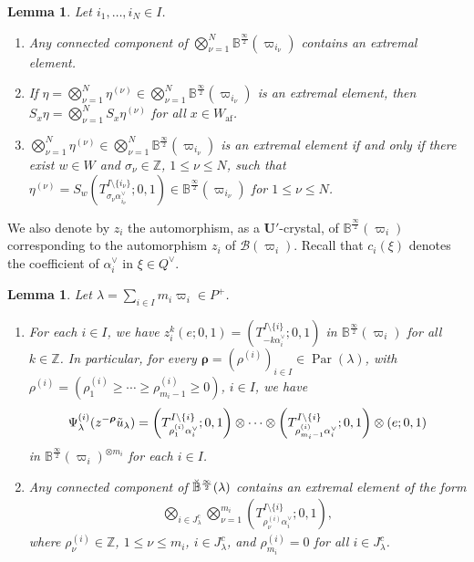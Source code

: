\documentclass[10pt]{amsart}
\newtheorem{lemm}[theo]{Lemma}
\theoremstyle{definition}\newtheorem{defi}[theo]{Definition}
\theoremstyle{remark}\newtheorem{rema}[theo]{Remark}
\newcommand{\BZ}{\mathbb{Z}}
\newcommand\bmrho[1]{\boldsymbol{#1}}
\newcommand{\U}{\mathbf{U}}
\newcommand{\si}{\frac{\infty}{2}}
\DeclareMathOperator{\af}{af}
\DeclareMathOperator{\Par}{Par}
\begin{document}
\begin{lemm} \label{lem:extremal-paths}
Let 
$i_1 , \ldots , i_N \in I$. 
\begin{enumerate}[label=(\arabic*)]
\item\label{Lemm3.7_1}
Any connected component of 
$\bigotimes_{\nu = 1}^N \mathbb{B}^{\si}(\varpi_{i_{\nu}})$ 
contains an extremal element.
\item\label{Lemm3.7_2}
If 
$\eta = \bigotimes_{\nu = 1}^N \eta^{(\nu)} \in \bigotimes_{\nu = 1}^N \mathbb{B}^{\si}(\varpi_{i_{\nu}})$
is an extremal element, then 
$S_x \eta = \bigotimes_{\nu = 1}^N S_x \eta^{(\nu)}$
for all 
$x \in W_{\af}$. 
\item\label{Lemm3.7_3}
$\bigotimes_{\nu = 1}^N \eta^{(\nu)} \in \bigotimes_{\nu = 1}^N \mathbb{B}^{\si}(\varpi_{i_{\nu}})$
is an extremal element if and only if there exist
$w \in W$ 
and 
$\sigma_{\nu} \in \BZ$, $1 \leq \nu \leq N$, 
such that 
$\eta^{(\nu)} 
= 
S_w \left( T^{I \setminus \{ i_{\nu} \}}_{\sigma_{\nu} \alpha_{i_{\nu}}^{\vee}} ; 0,1 \right) \in \mathbb{B}^{\si}(\varpi_{i_{\nu}})$
for 
$1 \leq \nu \leq N$. 
\end{enumerate}
\end{lemm}

We also denote by
$z_i$ 
the automorphism, as a $\U'$-crystal, of 
$\mathbb{B}^{\si}(\varpi_i)$ 
corresponding to the automorphism 
$z_i$ 
of 
$\mathcal{B}(\varpi_i)$.
Recall that 
$c_i(\xi)$ 
denotes the coefficient of 
$\alpha_i^{\vee}$ 
in 
$\xi \in Q^{\vee}$.

\begin{lemm} \label{lem:SiLS_W-action}
Let 
$\lambda = \sum_{i \in I} m_i \varpi_i \in P^+$. 
\begin{enumerate}[label=(\arabic*)]
\item\label{Lemm3.8_1}
For each $i \in I$, 
we have
$z_i^k(e;0,1) = \left( T^{I \setminus \{ i \}}_{-k \alpha_i^{\vee}} ; 0,1 \right)$
in 
$\mathbb{B}^{\si}(\varpi_i)$
for all 
$k \in \BZ$. 
In particular, 
for every 
$\bmrho{\rho} = (\rho^{(i)})_{i \in I} \in \Par (\lambda)$, 
with 
$\rho^{(i)} = (\rho^{(i)}_1 \geq \cdots \geq \rho^{(i)}_{m_i-1} \geq 0)$, 
$i \in I$, 
we have
\begin{align}
\Psi_{\lambda}^{(i)}(z^{-\bmrho{\rho}} \Tilde{u}_{\lambda}) 
=
\left( T_{\rho^{(i)}_1 \alpha_i^{\vee}}^{I \setminus \{ i \}} ; 0,1\right)
\otimes \cdots \otimes
\left( T_{\rho^{(i)}_{m_i-1} \alpha_i^{\vee}}^{I \setminus \{ i \}} ; 0,1\right)
\otimes
(e;0,1)
\end{align}
in 
$\mathbb{B}^{\si}(\varpi_i)^{\otimes m_i}$
for each 
$i \in I$. 
\item\label{Lemm3.8_2}
Any connected component of 
$\Breve{\mathbb{B}}^{\si}(\lambda)$
contains an extremal element of the form 
\begin{align}
\bigotimes_{i \in J_{\lambda}^c} \bigotimes_{\nu = 1}^{m_i} \left(T^{I \setminus \{ i \}}_{\rho^{(i)}_{\nu} \alpha_i^{\vee}};0,1 \right),
\end{align}
where 
$\rho^{(i)}_{\nu} \in \BZ$, 
$1 \leq \nu \leq m_i$, 
$i \in J_{\lambda}^c$, 
and 
$\rho^{(i)}_{m_i} = 0$
for all 
$i \in J_{\lambda}^c$.
\end{enumerate}
\end{lemm}
\end{document}
